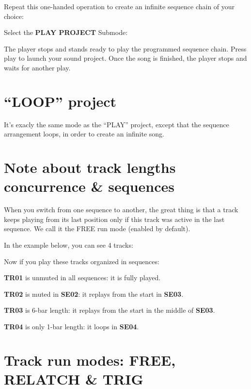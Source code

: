 Repeat this one-handed operation to create an infinite sequence chain of your choice:


Select the \textbf{PLAY PROJECT} Submode:


The player stops and stands ready to play the programmed sequence chain. Press play \playicon{} to launch your sound project. Once the song is finished, the player stops and waits for another play.



\section{“LOOP” project}

It's exacly the same mode as the ``PLAY'' project, except that the sequence arrangement loops, in order to create an infinite song.



\section{Note about track lengths concurrence \& sequences}
\label{sec:note-track-len-seq}

When you switch from one sequence to another, the great thing is that a track keeps playing from its last position only if this track was active in the last sequence. We call it the FREE run mode (enabled by default).

In the example below, you can see 4 tracks:


Now if you play these tracks organized in sequences:


\textbf{TR01} is unmuted in all sequences: it is fully played.

\textbf{TR02} is muted in \textbf{SE02}: it replays from the start in \textbf{SE03}.

\textbf{TR03} is 6-bar length: it replays from the start in the middle of \textbf{SE03}.

\textbf{TR04} is only 1-bar length: it loops in \textbf{SE04}.


\section{Track run modes: FREE, RELATCH \& TRIG}

